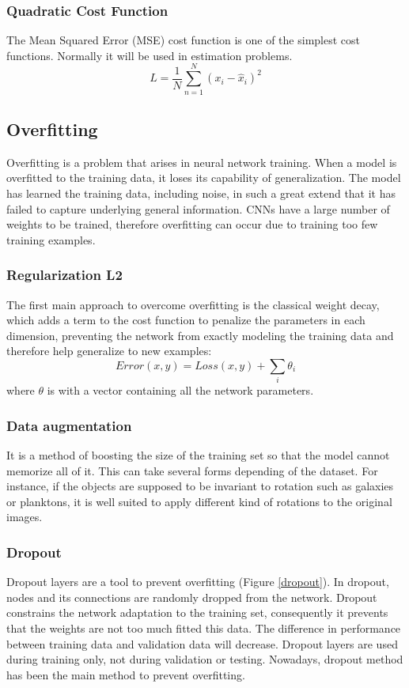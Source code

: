     \subsubsection{Quadratic Cost Function}
    The Mean Squared Error (MSE) cost function is one of the simplest cost functions. Normally it will be used in estimation problems\cite{boureau2008sparse}.
    \begin{equation}
        L =\frac{1}{N}\sum_{n=1}^{N}(x_i -\hat{x}_i)^2
    \end{equation}


    \subsection{Overfitting}
    Overfitting is a problem that arises in neural network training. When a model is overfitted to the training data, it loses its capability of generalization. The model has learned the training data, including noise, in such a great extend that it has failed to capture underlying general information. CNNs have a large number of weights to be trained, therefore overfitting can occur due to training too few training examples. 

    \subsubsection{Regularization  L2}
    The  first  main  approach  to  overcome  overfitting  is  the  classical weight decay, which adds a term to the cost function to penalize the parameters in each dimension, preventing the network from exactly modeling the training data and therefore help generalize to new examples:
    \begin{equation}
        Error(x, y) =  Loss(x, y) + \sum_{i}\theta_i
    \end{equation}
    where $\theta$ is with a vector containing all the network parameters.
    \subsubsection{Data augmentation}
    It is a method of boosting the size of the training set so that the model cannot memorize all of it.  This can take several forms depending of the dataset. For  instance,  if  the  objects  are  supposed  to  be  invariant  to  rotation  such  as  galaxies  or planktons, it is well suited to apply different kind of rotations to the original images.

    \subsubsection{Dropout}
    Dropout layers\cite{srivastava2014dropout} are a tool to prevent overfitting (Figure \ref{dropout}). In dropout, nodes and its connections are randomly dropped from the network. Dropout constrains the network adaptation to the training set, consequently it prevents that the weights are not too much fitted this data. The difference in performance between training data and validation data will decrease. Dropout layers are used during training only, not during validation or testing. Nowadays, dropout method has been the main method to prevent overfitting.

